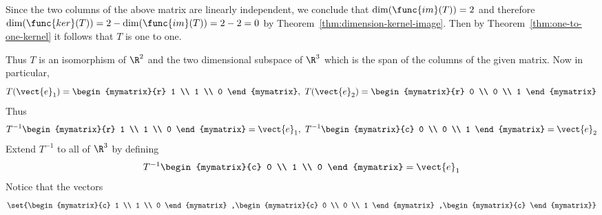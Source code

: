 \begin{solution}
Since the two columns of the above matrix are linearly independent, we conclude that $\dim(\func{im}(T)) = 2$ and therefore $\dim(\func{ker}(T)) = 2 - \dim(\func{im}(T)) = 2-2 = 0$ by Theorem~\ref{thm:dimension-kernel-image}. Then by Theorem~\ref{thm:one-to-one-kernel} it follows that $T$ is one to one.

Thus $T$ is an isomorphism of $\R^{2}$ and the two dimensional subspace of $\R^{3}$ which is the
span of the columns of the given matrix. Now in particular,
\begin{equation*}
T(\vect{e}_{1})=\begin{mymatrix}{r}
1 \\
1 \\
0
\end{mymatrix} ,\ T(\vect{e}_{2})=\begin{mymatrix}{r}
0 \\
0 \\
1
\end{mymatrix}
\end{equation*}
Thus
\begin{equation*}
T^{-1}\begin{mymatrix}{r}
1 \\
1 \\
0
\end{mymatrix} =\vect{e}_{1},\ T^{-1}\begin{mymatrix}{c}
0 \\
0 \\
1
\end{mymatrix} =\vect{e}_{2}
\end{equation*}
Extend $T^{-1}$ to all of $\R^{3}$ by defining
\begin{equation*}
T^{-1}\begin{mymatrix}{c}
0 \\
1 \\
0
\end{mymatrix} =\vect{e}_{1}
\end{equation*}
Notice that the vectors
\begin{equation*}
\set{\begin{mymatrix}{c}
1 \\
1 \\
0
\end{mymatrix} ,\begin{mymatrix}{c}
0 \\
0 \\
1
\end{mymatrix} ,\begin{mymatrix}{c}

\end{mymatrix}}
\end{equation*}
\end{solution}
